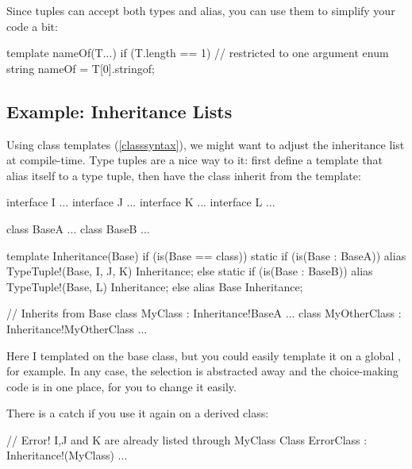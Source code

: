 Since tuples can accept both types and alias, you can use them to simplify your code a bit:

\begin{dcode}
template nameOf(T...) if (T.length == 1) // restricted to one argument
{
    enum string nameOf = T[0].stringof;
}
\end{dcode}


\subsection{Example: Inheritance Lists}\label{inheritancelist}


Using class templates (\ref{classsyntax}), we might want to adjust the inheritance list at compile-time. Type tuples are a nice way to it: first define a template that alias itself to a type tuple, then have the class inherit from the template:

\begin{dcode}
interface I { ... }
interface J { ... }
interface K { ... }
interface L { ... }

class BaseA { ... }
class BaseB { ... }

template Inheritance(Base) if (is(Base == class))
{
    static if (is(Base : BaseA))
        alias TypeTuple!(Base, I, J, K) Inheritance;
    else static if (is(Base : BaseB))
        alias TypeTuple!(Base, L)       Inheritance;
    else
        alias Base                      Inheritance;
}

// Inherits from Base
class MyClass : Inheritance!BaseA { ... }
class MyOtherClass : Inheritance!MyOtherClass { ... }
\end{dcode}

Here I templated  on the base class, but you could easily template it on a global , for example. In any case, the selection is abstracted away and the choice-making code is in one place, for you to change it easily.

There is a catch if you use it again on a derived class:

\begin{dcode}
// Error! I,J and K are already listed through MyClass
Class ErrorClass : Inheritance!(MyClass) { ... }
\end{dcode}

